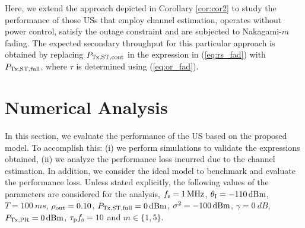 \begin{coro} \label{cor:cor3}
Here, we extend the approach depicted in Corollary \ref{cor:cor2} to study the performance of those USs that employ channel estimation, operates without power control, satisfy the outage constraint and are subjected to Nakagami-$m$ fading. The expected secondary throughput for this particular approach is obtained by replacing $P_{\text{Tx,ST,cont}}$ in the expression in (\ref{eq:rs_fad}) with $P_{\text{Tx,ST,full}}$, where $\tau$ is determined using (\ref{eq:or_fad}). 

\end{coro}
 
\section{Numerical Analysis} \label{sec:num_ana}
In this section, we evaluate the performance of the US based on the proposed model. To accomplish this: (i) we perform simulations to validate the expressions obtained, (ii) we analyze the performance loss incurred due to the channel estimation. In addition, we consider the ideal model to benchmark and evaluate the performance loss. %
Unless stated explicitly, the following values of the parameters are considered for the analysis, $f_{\text{s}} = \SI{1}{MHz}$,  $\theta_{\text{I}} = \SI{-110}{dBm}$, $T = \SI{100}{ms}$, $\rho_{\text{out}} = 0.10$, $P_{\text{Tx,ST,full}} = \SI{0}{dBm}$, $\sigma^2 = \SI{-100}{dBm}$, $\gamma = \SI{0}{dB}$, $P_{\text{Tx,PR}} = \SI{0}{dBm}$, $\tau_{\text{p}}{f_{\text{s}}} = 10$ and $m \in \{1,5\}$.


